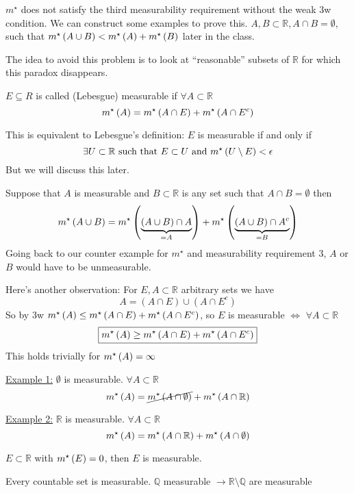 $m^{\star}$ does not satisfy the third measurability requirement without the weak 3w condition.
We can construct some examples to prove this.
$A, B \subset \mathbb{R}, A \cap B = \emptyset$, such that $m^{\star}\left(A \cup B\right) < m^{\star}\left(A\right) + m^{\star}\left(B\right)$ later in the class.

The idea to avoid this problem is to look at ``reasonable'' subsets of $\mathbb{R}$ for which this paradox disappears.

\begin{definition}
    $E \subseteq R$ is called (Lebesgue) measurable if $\forall A \subset \mathbb{R}$
    \[
        m^{\star}\left(A\right) = m^{\star}\left(A \cap E\right) + m^{\star}\left(A \cap E^c\right)
    \]
\end{definition}
\begin{remark}
    This is equivalent to Lebesgue's definition: $E$ is measurable if and only if
    \[
        \exists U \subset \mathbb{R} \text{ such that } E \subset U \text{ and } m^{\star}\left(U \setminus E\right) < \epsilon
    \]
    But we will discuss this later.
\end{remark}

Suppose that $A$ is measurable and $B \subset \mathbb{R}$ is any set such that $A \cap B = \emptyset$ then
\[
    m^{\star}\left(A \cup B\right) = m^{\star}\left(\underbrace{(A \cup B) \cap A}_{=A}\right) + m^{\star}\left(\underbrace{(A \cup B) \cap A^{c}}_{=B}\right)
\]
Going back to our counter example for $m^{\star}$ and measurability requirement 3, $A$ or $B$ would have to be unmeasurable.

Here's another observation: For $E, A \subset \mathbb{R}$ arbitrary sets we have
\[
    A = (A \cap E) \cup (A \cap E^{c})
\]
So by 3w $m^{\star}\left(A\right) \leq m^{\star}\left(A \cap E\right) + m^{\star}\left(A \cap E^{c}\right)$, so $E$ is measurable $\iff$ $\forall A \subset \mathbb{R}$
\[
    \boxed{m^{\star}\left(A\right) \geq m^{\star}\left(A \cap E\right) + m^{\star}\left(A \cap E^{c}\right)}
\]
This holds trivially for $m^{\star}\left(A\right) = \infty$

\underline{Example 1:} $\emptyset$ is measurable.
$\forall A \subset \mathbb{R}$
\[
    m^{\star}\left(A\right) = \cancel{m^{\star}\left(A \cap \emptyset\right)} + m^{\star}\left(A \cap \mathbb{R}\right)
\]

\underline{Example 2:} $\mathbb{R}$ is measurable.
$\forall A \subset \mathbb{R}$
\[
    m^{\star}\left(A\right) = m^{\star}\left(A \cap \mathbb{R}\right) + m^{\star}\left(A \cap \emptyset\right)
\]

\begin{prop}
    $E \subset \mathbb{R}$ with $m^{\star}\left(E\right) = 0$, then $E$ is measurable.
\end{prop}

\begin{*corollary}
    Every countable set is measurable.
    $\mathbb{Q}$ measurable $\rightarrow \mathbb{R} \setminus \mathbb{Q}$ are measurable
\end{*corollary}

